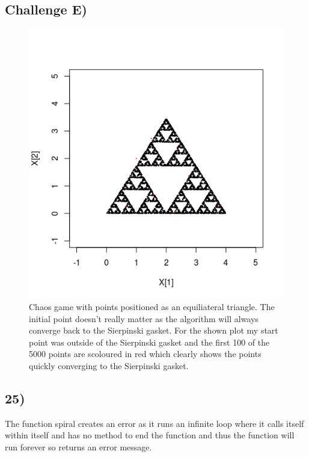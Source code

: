 \documentclass[11pt]{article}
\begin{document}
\subsection*{Challenge E)}
\begin{figure}[H]
\begin{center}
\includegraphics[scale=0.5]{../Results/Plots/Challenge_E.png}
\caption{Chaos game with points positioned as an equiliateral triangle. The initial point doesn't really matter as the algorithm will always converge back to the Sierpinski gasket. For the shown plot my start point was outside of the Sierpinski gasket and the first 100 of the 5000 points are scoloured in red which clearly shows the points quickly converging to the Sierpinski gasket.}
\end{center}
\end{figure}
\subsection*{25)}
The function spiral creates an error as it runs an infinite loop where it calls itself within itself and has no method to end the function and thus the function will run forever so returns an error message.\\
\end{document}
